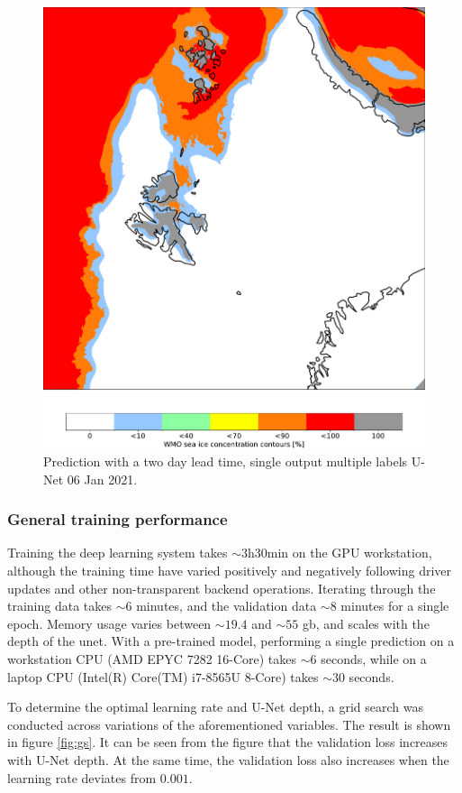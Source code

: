 \documentclass[../main/thesis]{subfiles}
\begin{document}
\begin{figure}
    \centering
    \includegraphics[width=.6\textwidth]{20210106}
    \caption{\label{fig:singleoutmodel}Prediction with a two day lead time, single output multiple labels U-Net 06 Jan 2021.}
\end{figure}

\subsubsection{General training performance}
Training the deep learning system takes $\sim 3\text{h}30\text{min}$ on the GPU workstation, although the training time have varied positively and negatively following driver updates and other non-transparent backend operations. Iterating through the training data takes $\sim 6$ minutes, and the validation data $\sim 8$ minutes for a single epoch. Memory usage varies between $\sim19.4$ and $\sim55$ gb, and scales with the depth of the unet. With a pre-trained model, performing a single prediction on a workstation CPU (AMD EPYC 7282 16-Core) takes $\sim 6$ seconds, while on a laptop CPU (Intel(R) Core(TM) i7-8565U 8-Core) takes $\sim 30$ seconds.

To determine the optimal learning rate and U-Net depth, a grid search was conducted across variations of the aforementioned variables. The result is shown in figure \ref{fig:gs}. It can be seen from the figure that the validation loss increases with U-Net depth. At the same time, the validation loss also increases when the learning rate deviates from $0.001$.
\end{document}
